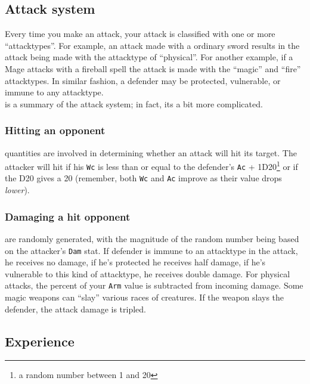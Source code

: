\subsection{Attack system}
\label{sec:combat}

Every time you make an attack, your attack is classified with one or more
``attacktypes''. For example, an attack made with a ordinary sword
results in the attack being made with the attacktype of ``physical''.
For another example, if a Mage attacks with a fireball spell the
attack is made with the ``magic'' and ``fire'' attacktypes. In
similar fashion, a defender may be protected, vulnerable, or immune
to any attacktype. \\

 is a summary of the attack system; in fact, its a
bit more complicated. \\

\subsubsection{Hitting an opponent}
 quantities are involved in determining whether an attack will
hit its target.  The attacker will hit if his {\tt Wc} is less than or equal
to the
defender's {\tt Ac} + 1D20\footnote{a random number between 1 and 20} or
if the D20 gives a 20 (remember, both {\tt Wc} and {\tt Ac} improve as
their value drops {\em lower}).\\

\subsubsection{Damaging a hit opponent}
 are randomly generated, with the magnitude of the random number
being based on the attacker's {\tt Dam} stat.
If defender is immune to an attacktype
in the attack, he receives no damage, if he's protected he receives
half damage, if he's vulnerable to this kind of
attacktype, he receives double damage. For physical attacks, the percent
of your {\tt Arm} value is subtracted from incoming damage.
Some magic weapons can ``slay'' various races of creatures. If the weapon
slays the defender, the attack damage is tripled.


\subsection{Experience}\label{sec:experience}

